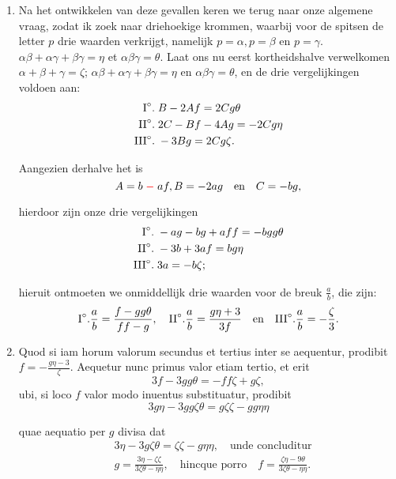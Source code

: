 \documentclass[10pt,a4paper]{article}
\newcommand{\switchenum}{\setcounter{enumi}{\arabic{enumi}-1}\switchcolumn}
\begin{document}
\begin{paracol}{2}
\begin{enumerate}[topsep=1px]
		\switchenum
		\item Na het ontwikkelen van deze gevallen keren we terug naar onze algemene vraag, zodat ik zoek naar driehoekige krommen, waarbij voor de spitsen de letter $p$ drie waarden verkrijgt, namelijk $p=\alpha, p=\beta$ en $p=\gamma$. $\alpha\beta + \alpha \gamma + \beta \gamma = \eta$ et $\alpha \beta \gamma = \theta$. Laat ons nu eerst kortheidshalve verwelkomen  $\alpha+\beta+\gamma = \zeta$; $\alpha\beta + \alpha \gamma + \beta \gamma = \eta$ en $\alpha \beta \gamma = \theta$, en de drie vergelijkingen voldoen aan:
		\begin{align*}
			\text{I}\degree. \;&B -2Af = 2Cg\theta\\
			\text{II}\degree. \;& 2C-Bf-4Ag = -2Cg\eta\\
			\text{III}\degree. \;& -3Bg = 2Cg\zeta.
		\end{align*}
		\par Aangezien derhalve het is
		\[
			A=b\;{\color{red}-}\;af, B=-2ag \quad\text{en}\quad C= -bg,
		\]
		\par hierdoor zijn onze drie vergelijkingen
		\begin{align*}
			\text{I}\degree. \;& -ag -bg+aff = -bgg\theta\\
			\text{II}\degree. \;& -3b +3af = bg\eta\\
			\text{III}\degree. \;& 3a=-b\zeta;		
		\end{align*}
		\par hieruit ontmoeten we onmiddellijk drie waarden voor de breuk $\frac{a}{b}$, die zijn:
		\[
			\text{I}\degree. \frac{a}{b} = \frac{f-gg\theta}{ff-g},\quad  \text{II}\degree. \frac{a}{b} = \frac{g\eta + 3}{3f} \quad \text{en}\quad \text{III}\degree. \frac{a}{b} = -\frac{\zeta}{3}.
		\]
		
		\switchcolumn*
		
		\item Quod si iam horum valorum secundus et tertius inter se aequentur, prodibit $f=-\frac{g\eta -3 }{\zeta}$. Aequetur nunc primus valor etiam tertio, et erit
		\[
			3f-3gg\theta = -ff \zeta + g \zeta,
		\]
		ubi, si loco $f$ valor modo inuentus substituatur, prodibit
		\[
			3g\eta -3gg\zeta \theta = g\zeta \zeta - gg\eta \eta
		\]
		\par quae aequatio per $g$ divisa dat
		\begin{align*}
			&3\eta - 3g\zeta \theta = \zeta \zeta - g\eta \eta, \quad \text{unde concluditur}\\
			&g= \frac{3\eta - \zeta \zeta}{3\zeta \theta - \eta \eta}, \quad \text{hincque porro} \quad f = \frac{\zeta \eta - 9\theta}{3\zeta \theta - \eta \eta}.
		\end{align*}
		

\end{enumerate}
\end{paracol}
\end{document}
